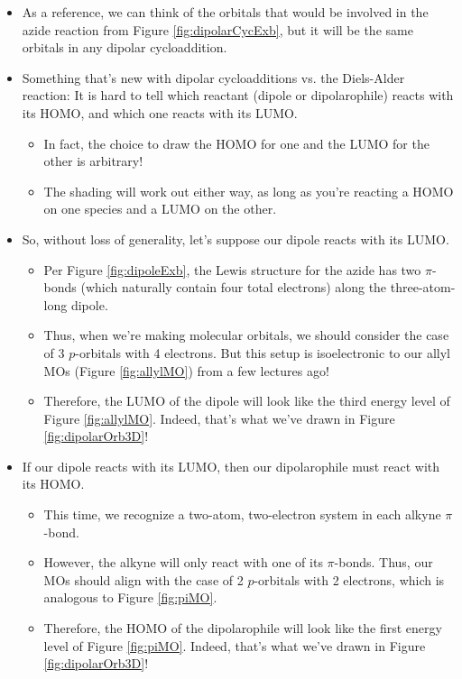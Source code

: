 \documentclass[../notes.tex]{subfiles}
\begin{document}
\begin{itemize}
    \begin{itemize}
        \item As a reference, we can think of the orbitals that would be involved in the azide reaction from Figure \ref{fig:dipolarCycExb}, but it will be the same orbitals in any dipolar cycloaddition.
        \item Something that's new with dipolar cycloadditions vs. the Diels-Alder reaction: It is hard to tell which reactant (dipole or dipolarophile) reacts with its HOMO, and which one reacts with its LUMO.
        \begin{itemize}
            \item In fact, the choice to draw the HOMO for one and the LUMO for the other is arbitrary!
            \item The shading will work out either way, as long as you're reacting a HOMO on one species and a LUMO on the other.
        \end{itemize}
        \pagebreak
        \item So, without loss of generality, let's suppose our dipole reacts with its LUMO.
        \begin{itemize}
            \item Per Figure \ref{fig:dipoleExb}, the Lewis structure for the azide has two $\pi$-bonds (which naturally contain four total electrons) along the three-atom-long dipole.
            \item Thus, when we're making molecular orbitals, we should consider the case of 3 $p$-orbitals with 4 electrons. But this setup is isoelectronic to our allyl MOs (Figure \ref{fig:allylMO}) from a few lectures ago!
            \item Therefore, the LUMO of the dipole will look like the third energy level of Figure \ref{fig:allylMO}. Indeed, that's what we've drawn in Figure \ref{fig:dipolarOrb3D}!
        \end{itemize}
        \item If our dipole reacts with its LUMO, then our dipolarophile must react with its HOMO.
        \begin{itemize}
            \item This time, we recognize a two-atom, two-electron system in each alkyne $\pi$-bond.
            \item However, the alkyne will only react with one of its $\pi$-bonds. Thus, our MOs should align with the case of 2 $p$-orbitals with 2 electrons, which is analogous to Figure \ref{fig:piMO}.
            \item Therefore, the HOMO of the dipolarophile will look like the first energy level of Figure \ref{fig:piMO}. Indeed, that's what we've drawn in Figure \ref{fig:dipolarOrb3D}!

\end{itemize}
\end{itemize}
\end{itemize}
\end{document}
